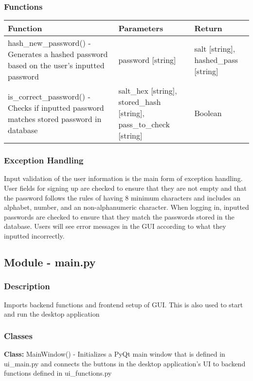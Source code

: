 \documentclass[12pt, titlepage]{article}
\begin{document}
  \subsubsection{Functions}
    \noindent \begin{tabular}{| p{} | p{}| p{}|}
      \hline
      \rowcolor[gray]{0.9}
      Function & Parameters & Return\\
      \hline
      hash\_new\_password() - Generates a hashed password based on the user’s inputted password & password [string] & salt [string], hashed\_pass [string] \\
      \hline
      is\_correct\_password() - Checks if inputted password matches stored password in database & salt\_hex [string], stored\_hash [string], pass\_to\_check [string] & Boolean \\
      \hline
    \end{tabular}

  \subsubsection{Exception Handling}
  Input validation of the user information is the main form of exception handling. User fields for signing up are checked to ensure that they are not empty and that the password follows the rules of having 8 minimum characters and includes an alphabet, number, and an non-alphanumeric character. When logging in, inputted passwords are checked to ensure that they match the passwords stored in the database. Users will see error messages in the GUI according to what they inputted incorrectly.

  \subsection{Module - main.py}

  \subsubsection{Description}
  Imports backend functions and frontend setup of GUI. This is also used to start and run the desktop application

  \subsubsection{Classes}
  \textbf{Class:} MainWindow() - Initializes a PyQt main window that is defined in ui\_main.py and connects the buttons in the desktop application’s UI to backend functions defined in ui\_functions.py \\
\end{document}
